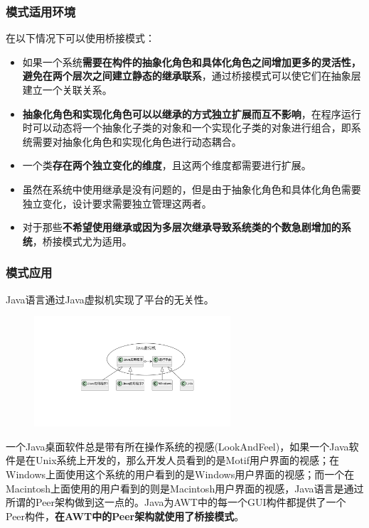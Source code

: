 \subsubsection{模式适用环境}
在以下情况下可以使用桥接模式：
\begin{itemize}
    \item 如果一个系统\textbf{需要在构件的抽象化角色和具体化角色之间增加更多的灵活性，避免在两个层次之间建立静态的继承联系}，通过桥接模式可以使它们在抽象层建立一个关联关系。
    \item \textbf{抽象化角色和实现化角色可以以继承的方式独立扩展而互不影响}，在程序运行时可以动态将一个抽象化子类的对象和一个实现化子类的对象进行组合，即系统需要对抽象化角色和实现化角色进行动态耦合。
    \item 一个类\textbf{存在两个独立变化的维度}，且这两个维度都需要进行扩展。
    \item 虽然在系统中使用继承是没有问题的，但是由于抽象化角色和具体化角色需要独立变化，设计要求需要独立管理这两者。
    \item 对于那些\textbf{不希望使用继承或因为多层次继承导致系统类的个数急剧增加的系统}，桥接模式尤为适用。
\end{itemize}

\subsubsection{模式应用}
 Java语言通过Java虚拟机实现了平台的无关性。
\begin{figure}[H]
    \vspace{-0.5em}
	\centering
	\includegraphics[width=0.65\textwidth]{images/桥接模式应用1.pdf}
    \vspace{-1em}
\end{figure}

 一个Java桌面软件总是带有所在操作系统的视感(LookAndFeel)，如果一个Java软件是在Unix系统上开发的，那么开发人员看到的是Motif用户界面的视感；在Windows上面使用这个系统的用户看到的是Windows用户界面的视感；而一个在Macintosh上面使用的用户看到的则是Macintosh用户界面的视感，Java语言是通过所谓的Peer架构做到这一点的。Java为AWT中的每一个GUI构件都提供了一个Peer构件，\textbf{在AWT中的Peer架构就使用了桥接模式}。


